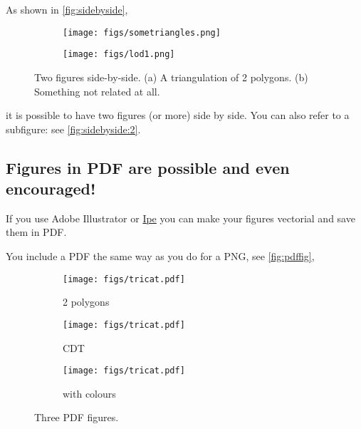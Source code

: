 \documentclass[a4paper,11pt,parskip=half]{scrartcl}
\begin{document}
As shown in \autoref{fig:sidebyside},
\begin{figure}
  \centering
  \begin{subfigure}[b]{0.3\linewidth}
    \centering
    \texttt{[image: figs/sometriangles.png]}
    \caption{}\label{fig:sidebyside:1}
  \end{subfigure}%
  \qquad %
  \begin{subfigure}[b]{0.6\linewidth}
    \centering
    \texttt{[image: figs/lod1.png]}
    \caption{}\label{fig:sidebyside:2}
  \end{subfigure}%
  \caption[Shortened title for the list of figures]{Two figures side-by-side. (a) A triangulation of 2 polygons. (b) Something not related at all.}%
\label{fig:sidebyside}
\end{figure}
it is possible to have two figures (or more) side by side.
You can also refer to a subfigure: see \autoref{fig:sidebyside:2}.


\subsection[Shorter section name for the TOC]{Figures in PDF are possible and even encouraged!}%
\label{sec:pdf}

If you use Adobe Illustrator or \href{http://ipe7.sourceforge.net}{Ipe} you can make your figures vectorial and save them in PDF\@.

You include a PDF the same way as you do for a PNG, see \autoref{fig:pdffig},
\begin{figure}
  \centering
  \begin{subfigure}[b]{0.28\linewidth}
    \centering
    \texttt{[image: figs/tricat.pdf]}
    \caption{2 polygons}\label{fig:pdffig:1}
  \end{subfigure}%
  \qquad %
  \begin{subfigure}[b]{0.28\linewidth}
    \centering
    \texttt{[image: figs/tricat.pdf]}
    \caption{CDT }\label{fig:pdffig:2}
  \end{subfigure}%
  \qquad %
  \begin{subfigure}[b]{0.28\linewidth}
    \centering
    \texttt{[image: figs/tricat.pdf]}
    \caption{with colours}\label{fig:pdffig:3}
  \end{subfigure}%
  \caption{Three PDF figures.}%
\label{fig:pdffig}
\end{figure}
\end{document}

